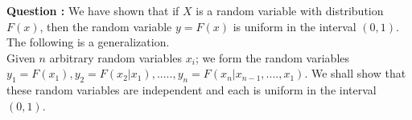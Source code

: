 \documentclass[journal,12pt,twocolumn]{IEEEtran}
\begin{document}
\maketitle
%
%

\noindent \textbf{Question :}
We have shown that if $  X  $ is a random variable with distribution $ F(x) $, 
then the random variable $ y = F(x) $ is uniform in the interval $  (0, 1) $. The following is a 
generalization. \\
Given $ n $ arbitrary random variables $  x_{i} $; we form the random variables 
$ y_{1}=F(x_{1}) ,y_{2}=F(x_{2}|x_{1}), ..... , y_{n}=F(x_{n}|x_{n-1},....,x_1{})  $.
We shall show that these random variables are independent and each is uniform in the 
interval $ (0, 1) $. 
\end{document}
